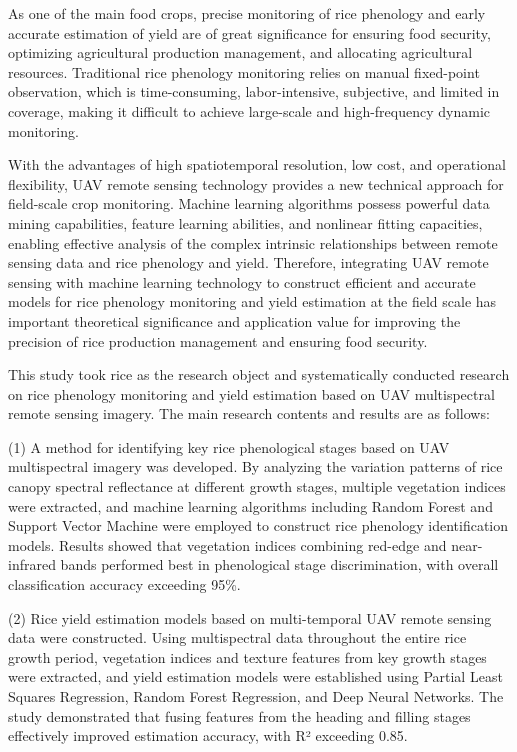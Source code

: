 {\setlength{\baselineskip}{18pt}%
As one of the main food crops, precise monitoring of rice phenology and early accurate estimation of yield are of great significance for ensuring food security, optimizing agricultural production management, and allocating agricultural resources. Traditional rice phenology monitoring relies on manual fixed-point observation, which is time-consuming, labor-intensive, subjective, and limited in coverage, making it difficult to achieve large-scale and high-frequency dynamic monitoring.

With the advantages of high spatiotemporal resolution, low cost, and operational flexibility, UAV remote sensing technology provides a new technical approach for field-scale crop monitoring. Machine learning algorithms possess powerful data mining capabilities, feature learning abilities, and nonlinear fitting capacities, enabling effective analysis of the complex intrinsic relationships between remote sensing data and rice phenology and yield. Therefore, integrating UAV remote sensing with machine learning technology to construct efficient and accurate models for rice phenology monitoring and yield estimation at the field scale has important theoretical significance and application value for improving the precision of rice production management and ensuring food security.

This study took rice as the research object and systematically conducted research on rice phenology monitoring and yield estimation based on UAV multispectral remote sensing imagery. The main research contents and results are as follows:

(1) A method for identifying key rice phenological stages based on UAV multispectral imagery was developed. By analyzing the variation patterns of rice canopy spectral reflectance at different growth stages, multiple vegetation indices were extracted, and machine learning algorithms including Random Forest and Support Vector Machine were employed to construct rice phenology identification models. Results showed that vegetation indices combining red-edge and near-infrared bands performed best in phenological stage discrimination, with overall classification accuracy exceeding 95\%.

(2) Rice yield estimation models based on multi-temporal UAV remote sensing data were constructed. Using multispectral data throughout the entire rice growth period, vegetation indices and texture features from key growth stages were extracted, and yield estimation models were established using Partial Least Squares Regression, Random Forest Regression, and Deep Neural Networks. The study demonstrated that fusing features from the heading and filling stages effectively improved estimation accuracy, with R² exceeding 0.85.

}
